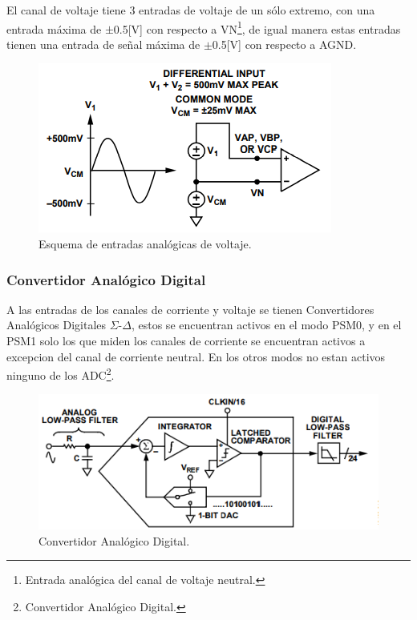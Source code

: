 \documentclass[letterpaper,12pt,oneside]{book}
\begin{document}
				El canal de voltaje tiene 3 entradas de voltaje de un sólo extremo, con una entrada máxima de  $\pm$0.5[V] con respecto a VN\footnote{Entrada analógica del canal de voltaje neutral.},
				de igual manera estas entradas tienen una entrada de señal máxima de $\pm$0.5[V] con respecto a AGND.

				\begin{figure}[!htpb]
					\centering
					\includegraphics[scale = 1.0]{Material de Consulta/EntAnVlt.PNG}
					\caption[Entradas analógicas de Voltaje]{Esquema de entradas analógicas de voltaje.}
					\label{EntVolt}
				\end{figure}

				\subsubsection{Convertidor Analógico Digital}
				A las entradas de los canales de corriente y voltaje se tienen Convertidores Analógicos Digitales $\Sigma$-$\Delta$, estos se encuentran activos en el modo PSM0, y en el PSM1 solo los que miden los canales de corriente se encuentran activos a excepcion del canal de corriente neutral. En los otros modos no estan activos ninguno de los ADC\footnote{Convertidor Analógico Digital.}.

				\begin{figure}[!htpb]
					\centering
					\includegraphics[scale = 1.0]{Material de Consulta/ADC_SigDel.PNG}
					\caption[Convertidor Analógico Digital]{Convertidor Analógico Digital.}
					\label{ADCSigDel}
				\end{figure}
\end{document}
